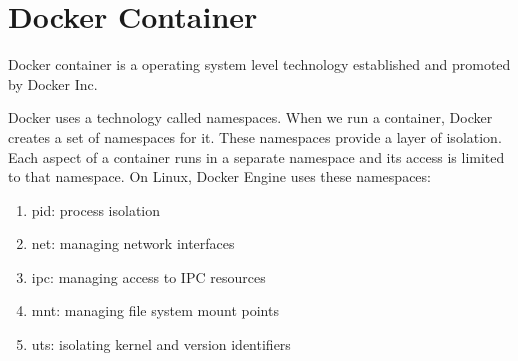 \section{Docker Container} \label{docker}
Docker container is a operating system level technology established  and promoted by Docker Inc.

Docker uses a technology called namespaces. When we run a container, Docker creates a set of namespaces for it. These namespaces provide a layer of isolation. Each aspect of a container runs in a separate namespace and its access is limited to that namespace.
On Linux, Docker Engine uses these namespaces:
\begin{enumerate}
\item pid: process isolation
\item net: managing network interfaces
\item ipc: managing access to IPC resources
\item mnt: managing file system mount points
\item uts: isolating kernel and version identifiers
\end{enumerate}

